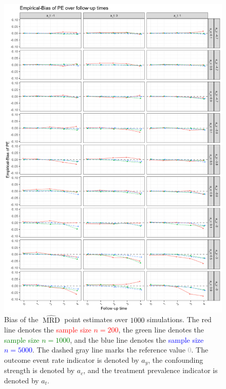 \documentclass[pdflatex,sn-vancouver-ay]{sn-jnl}%
\theoremstyle{thmstyleone}%
\theoremstyle{thmstyletwo}%
\theoremstyle{thmstylethree}%
\begin{document}
\begin{appendices}
\begin{figure}[H]
\centering
\includegraphics[height=0.95\textheight]{plots/plots_PE_bias.png}
\caption{Bias of the $\widehat{\operatorname{MRD}}$ point estimates over $1000$ simulations. The red line denotes the \textcolor{red}{sample size $n = 200$}, the green line denotes the \textcolor{green}{sample size $n = 1000$}, and the blue line denotes the \textcolor{blue}{sample size $n = 5000$}. The dashed gray line marks the reference value \textcolor{darkgray}{$0$}. The outcome event rate indicator is denoted by $a_y$, the confounding strength is denoted by $a_c$, and the treatment prevalence indicator is denoted by $a_t$.}\label{plt:bias}
\end{figure}

\newpage


\end{appendices}
\end{document}
